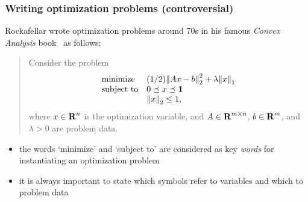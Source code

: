 \documentclass[usepdftitle=false]{beamer}
\begin{document}
\begin{frame}
    \frametitle{Writing optimization problems (controversial)}

    Rockafellar wrote optimization problems around 70s in his famous \emph{Convex Analysis} book~\cite{rockafellar1970convex} as follows:
    \begin{quote}
        Consider the problem
        \begin{equation}\label{prob:opt}
            \begin{array}{ll}
                \mbox{minimize}   & (1/2){\lVert Ax-b \rVert}_2^2 + \lambda {\lVert x \rVert}_1 \\
                \mbox{subject to} & 0 \preceq x \preceq \mathbf{1} \\
                & {\lVert x \rVert}_2 \leq 1,
            \end{array}
        \end{equation}
        where $x \in {\bf R{}}^n$ is the optimization variable, and $A \in {\bf R{}}^{m \times n}$, $b \in {\bf R{}}^m$, and $\lambda > 0$ are problem data.
    \end{quote}
    \begin{itemize}\itemsep=12pt
        \item the words `minimize' and `subject to' are considered as key \emph{words} for instantiating an optimization problem
        \item it is always important to state which symbols refer to variables and which to problem data
    \end{itemize}
\end{frame}
\end{document}
